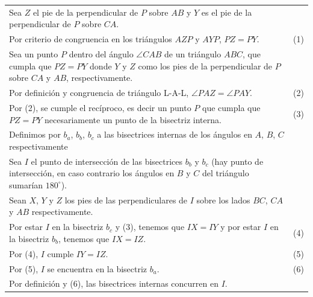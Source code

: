 \documentclass[12pt,a4paper]{article}
\begin{document}
\begin{tabular}{p{15.9cm}p{1cm}}
\\Sea $Z$ el pie de la perpendicular de $P$ sobre $AB$ y $Y$ es el pie de la perpendicular de $P$ sobre $CA$.
\\Por criterio de congruencia en los triángulos $AZP$ y $AYP$, $PZ=PY$. & (1)
\\Sea un punto $P$ dentro del ángulo $\angle CAB$ de un triángulo $ABC$, que cumpla que $PZ=PY$ donde $Y$ y $Z$ como los pies de la perpendicular de $P$ sobre $CA$ y $AB$, respectivamente.
\\Por definición y congruencia de triángulo L-A-L, $\angle PAZ = \angle PAY$. &(2) 
\\Por (2), se cumple el recíproco, es decir un punto $P$ que cumpla que $PZ=PY$ necesariamente un punto de la bisectriz interna. & \medskip(3)
\\Definimos por $b_a$, $b_b$, $b_c$ a las bisectrices internas de los ángulos en $A$, $B$, $C$ respectivamente
\\Sea $I$ el punto de intersección de las bisectrices $b_b$ y $b_c$ (hay punto de intersección, en caso contrario los ángulos en $B$ y $C$ del triángulo sumarían $180^{\circ}$).
\\Sean $X$, $Y$ y $Z$ los pies de las perpendiculares de $I$ sobre los lados $BC$, $CA$ y $AB$ respectivamente. 
\\Por estar $I$ en la bisectriz $b_c$ y (3), tenemos que $IX=IY$ y por estar $I$ en la bisectriz $b_b$, tenemos que $IX=IZ$. &\medskip(4)
\\Por (4), $I$ cumple $IY=IZ$. &(5)
\\Por (5), $I$ se encuentra en la bisectriz $b_a$.& (6)
\\Por definición y (6), las bisectrices internas concurren en $I$.
\end{tabular}
\end{document}
